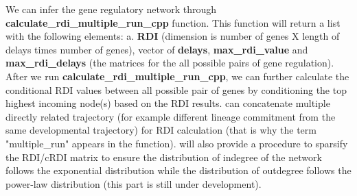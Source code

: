 \documentclass[10pt,oneside]{article}\usepackage[]{graphicx}\usepackage[]{color}
\begin{document}
We can infer the gene regulatory network through \textbf{calculate\_rdi\_multiple\_run\_cpp} function. This function will return a list with the following elements:
a. \textbf{RDI} (dimension is number of genes X length of delays times number of genes), vector of \textbf{delays}, \textbf{max\_rdi\_value} and \textbf{max\_rdi\_delays} (the matrices for the all possible pairs of gene regulation). After we run \textbf{calculate\_rdi\_multiple\_run\_cpp}, we can further calculate the conditional RDI values between all possible pair of genes by conditioning the top highest incoming node(s) based on the RDI results.  can concatenate multiple directly related trajectory (for example different lineage commitment from the same developmental trajectory) for RDI calculation (that is why the term "multiple\_run" appears in the function).  will also provide a procedure to sparsify the RDI/cRDI matrix to ensure  the distribution of indegree of the network follows the exponential distribution while the distribution of outdegree follows the power-law distribution (this part is still under development).
\end{document}
